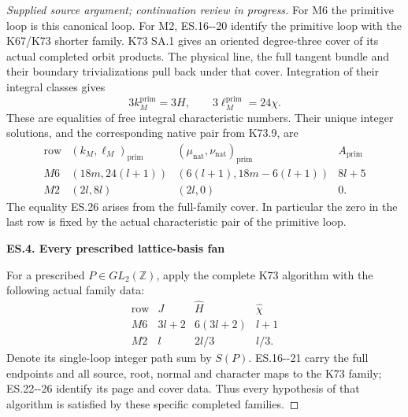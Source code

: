 \begin{proof}[Supplied source argument; continuation review in progress]
For M6 the primitive loop is this canonical loop. For M2,
ES.16-\/-20 identify the primitive loop with the K67/K73
shorter family. K73 SA.1 gives an oriented degree-three
cover of its actual completed orbit products. The physical
line, the full tangent bundle and their boundary
trivializations pull back under that cover. Integration of
their integral classes gives
\[
 3k_M^{\mathrm{prim}}=3H,\qquad
 3\ell_M^{\mathrm{prim}}=24\chi .
 \tag{ES.26}
\]
These are equalities of free integral characteristic numbers.
Their unique integer solutions, and the corresponding native
pair from K73.9, are
\[
 \begin{array}{c|c|c|c}
 \text{row}&(k_M,\ell_M)_{\mathrm{prim}}
 &(\mu_{\mathrm{nat}},\nu_{\mathrm{nat}})_{\mathrm{prim}}
 &A_{\mathrm{prim}}\\ \hline
 M6&(18m,24(l+1))&(6(l+1),18m-6(l+1))&8l+5\\
 M2&(2l,8l)&(2l,0)&0 .
 \end{array}
 \tag{ES.27}
\]
The equality ES.26 arises from the full-family cover. In
particular the zero in the last row is fixed by the actual
characteristic pair of the primitive loop.

\par

\medskip\noindent\textbf{ES.4. Every prescribed lattice-basis fan}

\par\nobreak

For a prescribed \(P\in GL_2(\mathbb Z)\), apply the complete
K73 algorithm with the following actual family data:
\[
 \begin{array}{c|c|c|c}
 \text{row}&J&\widehat H&\widehat\chi\\ \hline
 M6&3l+2&6(3l+2)&l+1\\
 M2&l&2l/3&l/3 .
 \end{array}
 \tag{ES.28}
\]
Denote its single-loop integer path sum by \(S(P)\).
ES.16-\/-21 carry the full endpoints and all source, root,
normal and character maps to the K73 family; ES.22-\/-26
identify its page and cover data. Thus every hypothesis of
that algorithm is satisfied by these specific completed
families.


\end{proof}
